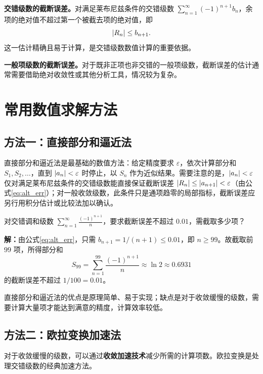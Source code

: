 \textbf{交错级数的截断误差。}对满足莱布尼兹条件的交错级数 $\displaystyle \sum_{n=1}^{\infty} (-1)^{n+1} b_n$，余项的绝对值不超过第一个被截去项的绝对值，即
\begin{equation} \label{eq:alt_err}
\abs{R_n} \leq b_{n+1}.
\end{equation}
这一估计精确且易于计算，是交错级数数值计算的重要依据。

\textbf{一般项级数的截断误差。}对于既非正项也非交错的一般项级数，截断误差的估计通常需要借助绝对收敛性或其他分析工具，情况较为复杂。

\section{常用数值求解方法}

\subsection{方法一：直接部分和逼近法}

直接部分和逼近法是最基础的数值方法：给定精度要求 $\varepsilon$，依次计算部分和 $S_1, S_2, \ldots$，直到 $\left|a_n\right| < \varepsilon$ 时停止，以 $S_n$ 作为近似结果。需要注意的是，$\left|a_n\right| < \varepsilon$ 仅对满足莱布尼兹条件的交错级数能直接保证截断误差 $\left|R_n\right| \leq \left|a_{n+1}\right| < \varepsilon$（由公式\eqref{eq:alt_err}）；对一般收敛级数，此条件只是通项趋零的局部指标，截断误差应另行用积分估计或比较法加以确认。

\begin{example}[交错调和级数的数值逼近]
对交错调和级数 $\displaystyle\sum_{n=1}^{\infty} \frac{(-1)^{n+1}}{n}$，要求截断误差不超过 $0.01$，需截取多少项？

\textbf{解：}由公式\eqref{eq:alt_err}，只需 $b_{n+1} = 1/(n+1) \leq 0.01$，即 $n \geq 99$。故截取前 $99$ 项，所得部分和
\begin{equation}
S_{99} = \sum_{n=1}^{99} \frac{(-1)^{n+1}}{n} \approx \ln 2 \approx 0.6931
\end{equation}
的截断误差不超过 $1/100 = 0.01$。
\end{example}

直接部分和逼近法的优点是原理简单、易于实现；缺点是对于收敛缓慢的级数，需要计算大量项才能达到满意的精度，计算效率较低。

\subsection{方法二：欧拉变换加速法}

对于收敛缓慢的级数，可以通过\textbf{收敛加速技术}减少所需的计算项数。欧拉变换是处理交错级数的经典加速方法。

